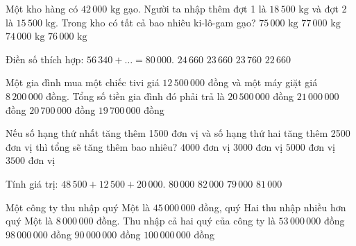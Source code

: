 \begin{ex} %
Một kho hàng có $42\,000\text{ kg}$ gạo. Người ta nhập thêm đợt 1 là $18\,500\text{ kg}$ và đợt 2 là $15\,500\text{ kg}$. Trong kho có tất cả bao nhiêu ki-lô-gam gạo?
\choice
{$75\,000\text{ kg}$}
{$77\,000\text{ kg}$}
{$74\,000\text{ kg}$}
{\True $76\,000\text{ kg}$}
\end{ex}

\begin{ex} %
Điền số thích hợp: $56\,340 + \dots = 80\,000$.
\choice
{$24\,660$}
{\True $23\,660$}
{$23\,760$}
{$22\,660$}
\end{ex}

\begin{ex} %
Một gia đình mua một chiếc tivi giá $12\,500\,000$ đồng và một máy giặt giá $8\,200\,000$ đồng. Tổng số tiền gia đình đó phải trả là
\choice
{$20\,500\,000$ đồng}
{$21\,000\,000$ đồng}
{\True $20\,700\,000$ đồng}
{$19\,700\,000$ đồng}
\end{ex}

\begin{ex} %
Nếu số hạng thứ nhất tăng thêm 1500 đơn vị và số hạng thứ hai tăng thêm 2500 đơn vị thì tổng sẽ tăng thêm bao nhiêu?
\choice
{\True $4000$ đơn vị}
{$3000$ đơn vị}
{$5000$ đơn vị}
{$3500$ đơn vị}
\end{ex}

\begin{ex} %
Tính giá trị: $48\,500 + 12\,500 + 20\,000$.
\choice
{$80\,000$}
{$82\,000$}
{$79\,000$}
{\True $81\,000$}
\end{ex}

\begin{ex} %
Một công ty thu nhập quý Một là $45\,000\,000$ đồng, quý Hai thu nhập nhiều hơn quý Một là $8\,000\,000$ đồng. Thu nhập cả hai quý của công ty là
\choice
{$53\,000\,000$ đồng}
{\True $98\,000\,000$ đồng}
{$90\,000\,000$ đồng}
{$100\,000\,000$ đồng}
\end{ex}

